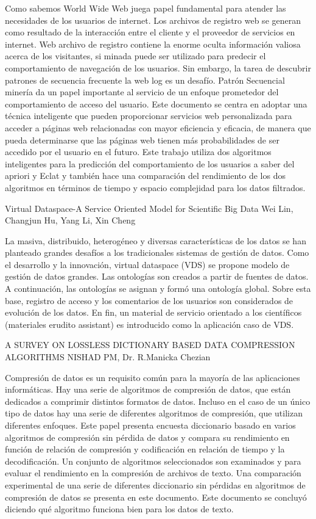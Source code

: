 Como sabemos World Wide Web juega papel fundamental para atender las necesidades de los usuarios de internet. Los archivos de registro web se generan como resultado de la interacción entre el cliente y el proveedor de servicios en internet. Web archivo de registro contiene la enorme oculta información valiosa acerca de los visitantes, si minada puede ser utilizado para predecir el comportamiento de navegación de los usuarios. Sin embargo, la tarea de descubrir patrones de secuencia frecuente la web log es un desafío. Patrón Secuencial minería da un papel importante al servicio de un enfoque prometedor del comportamiento de acceso del usuario. Este documento se centra en adoptar una técnica inteligente que pueden proporcionar servicios web personalizada para acceder a páginas web relacionadas con mayor eficiencia y eficacia, de manera que pueda determinarse que las páginas web tienen más probabilidades de ser accedido por el usuario en el futuro. Este trabajo utiliza dos algoritmos inteligentes para la predicción del comportamiento de los usuarios a saber del apriori y Eclat y también hace una comparación del rendimiento de los dos algoritmos en términos de tiempo y espacio complejidad para los datos filtrados.


Virtual Dataspace-A Service Oriented Model for Scientific Big Data
Wei Lin, Changjun Hu, Yang Li, Xin Cheng

La masiva, distribuido, heterogéneo y diversas características de los datos se han planteado grandes desafíos a los tradicionales sistemas de gestión de datos. Como el desarrollo y la innovación, virtual dataspace (VDS) se propone modelo de gestión de datos grandes. Las ontologías son creados a partir de fuentes de datos. A continuación, las ontologías se asignan y formó una ontología global. Sobre esta base, registro de acceso y los comentarios de los usuarios son considerados de evolución de los datos. En fin, un material de servicio orientado a los científicos (materiales erudito assistant) es introducido como la aplicación caso de VDS.


A SURVEY ON LOSSLESS DICTIONARY BASED DATA COMPRESSION ALGORITHMS
NISHAD PM, Dr. R.Manicka Chezian

Compresión de datos es un requisito común para la mayoría de las aplicaciones informáticas. Hay una serie de algoritmos de compresión de datos, que están dedicados a comprimir distintos formatos de datos. Incluso en el caso de un único tipo de datos hay una serie de diferentes algoritmos de compresión, que utilizan diferentes enfoques. Este papel presenta encuesta diccionario basado en varios algoritmos de compresión sin pérdida de datos y compara su rendimiento en función de relación de compresión y codificación en relación de tiempo y la decodificación. Un conjunto de algoritmos seleccionados son examinados y para evaluar el rendimiento en la compresión de archivos de texto. Una comparación experimental de una serie de diferentes diccionario sin pérdidas en algoritmos de compresión de datos se presenta en este documento. Este documento se concluyó diciendo qué algoritmo funciona bien para los datos de texto.



